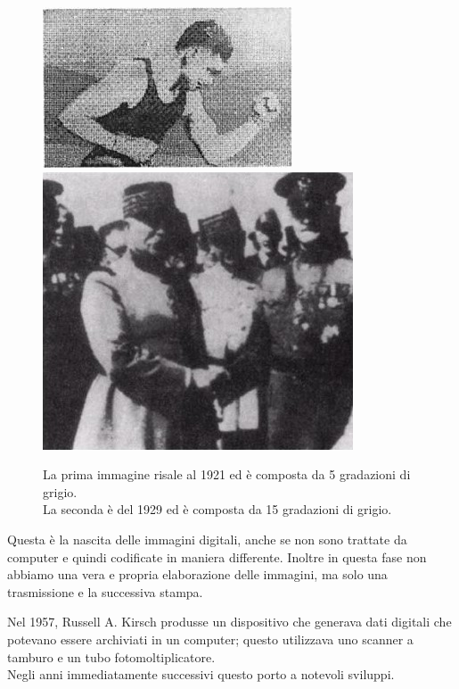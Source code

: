 \begin{figure}[htb] \centering
\includegraphics[scale=0.5, trim = 0 1.1cm 0 0, clip]{Pictures/img del 1921 a 5 gradazioni di grigio.jpg}
\qquad\qquad
\includegraphics[scale=1.7, trim = 0 1.1cm 0 0, clip]{Pictures/img del 1929 a 15 gradazioni di grigio.jpg}
\caption{La prima immagine risale al 1921 ed è composta da 5 gradazioni di grigio.\\ 
La seconda è del 1929 ed è composta da 15 gradazioni di grigio.}\label{fig:figura}
\end{figure}
\vspace{1em} \noindent
Questa è la nascita delle immagini digitali, anche se non sono trattate da computer e quindi codificate in maniera differente. Inoltre in questa fase non abbiamo una vera e propria elaborazione delle immagini, ma solo una trasmissione e la successiva stampa.

\vspace{1em} \noindent
Nel 1957, Russell A. Kirsch produsse un dispositivo che generava dati digitali che potevano essere archiviati in un computer; questo utilizzava uno scanner a tamburo e un tubo fotomoltiplicatore.\\
Negli anni immediatamente successivi questo porto a notevoli sviluppi.

